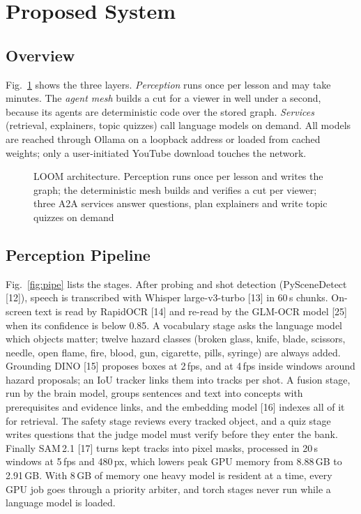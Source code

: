 \documentclass[9pt,a4paper]{extarticle}
\newcommand{\fig}[1]{Fig.~\ref{#1}}
\begin{document}
\section{Proposed System}
\subsection{Overview}
\fig{fig:arch} shows the three layers. \emph{Perception} runs once per lesson and may take minutes. The \emph{agent
mesh} builds a cut for a viewer in well under a second, because its agents are deterministic code over the stored
graph. \emph{Services} (retrieval, explainers, topic quizzes) call language models on demand. All models are reached
through Ollama on a loopback address or loaded from cached weights; only a user-initiated YouTube download touches the
network.

\begin{figure}[t]
\centering
\resizebox{\textwidth}{!}{}
\caption{LOOM architecture. Perception runs once per lesson and writes the graph; the deterministic mesh builds and
verifies a cut per viewer; three A2A services answer questions, plan explainers and write topic quizzes on demand}
\label{fig:arch}
\end{figure}

\subsection{Perception Pipeline}
\fig{fig:pipe} lists the stages. After probing and shot detection (PySceneDetect [12]), speech is transcribed with
Whisper large-v3-turbo [13] in 60\,s chunks. On-screen text is read by RapidOCR [14] and re-read by the GLM-OCR model
[25] when its confidence is below 0.85. A vocabulary stage asks the language model which objects matter; twelve hazard
classes (broken glass, knife, blade, scissors, needle, open flame, fire, blood, gun, cigarette, pills, syringe) are
always added. Grounding DINO [15] proposes boxes at 2\,fps, and at 4\,fps inside windows around hazard proposals; an IoU
tracker links them into tracks per shot. A fusion stage, run by the brain model, groups sentences and text into
concepts with prerequisites and evidence links, and the embedding model [16] indexes all of it for retrieval. The
safety stage reviews every tracked object, and a quiz stage writes questions that the judge model must verify before
they enter the bank. Finally SAM\,2.1 [17] turns kept tracks into pixel masks, processed in 20\,s windows at 5\,fps and
480\,px, which lowers peak GPU memory from 8.88\,GB to 2.91\,GB. With 8\,GB of memory one heavy model is resident at a
time, every GPU job goes through a priority arbiter, and torch stages never run while a language model is loaded.
\end{document}
